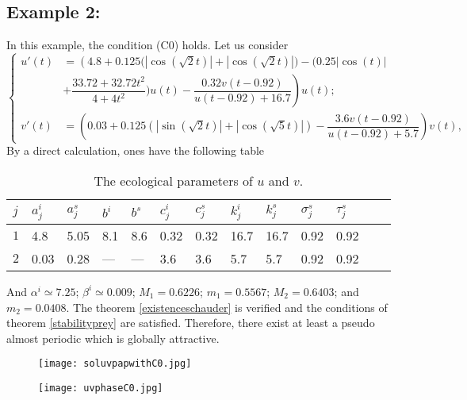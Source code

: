 \documentclass[[a4paper,10pt]{article}
\begin{document}
\subsection{Example 2:} \hspace{1cm}In this example, the condition (C0) holds. Let us consider
\begin{equation}
\left \{
\begin{aligned}
u'(t)&=\left(4.8+0.125\big(|\cos(\sqrt{2}t)|+|\cos(\sqrt{2}t)|\big)-\big(0.25|\cos(t)|\right.\\&+\left.\dfrac{33.72+32.72t^2}{4+4t^2}\big)u(t)-\dfrac{0.32 v(t-0.92)}{u(t-0.92)+16.7}\right)u(t);\\
v'(t)&=\left(0.03+0.125(|\sin(\sqrt 2t)|+|\cos(\sqrt 5t)|)-\dfrac{3.6v(t-0.92)}{u(t-0.92)+5.7}\right)v(t), 
\end{aligned}
\right. 
\end{equation}
By a direct calculation, ones have the following table
\begin{center}
\begin{table}[hptb]
\caption{The ecological parameters of $u$ and $v$.}
\begin{center}
\begin{tabular}{|p{0.5cm}|p{1cm}|p{1cm}| p{1cm}|p{1cm}|p{1cm}|p{1cm}|p{1cm}|p{1cm}|p{1cm}|p{1cm}|p{1cm}|l}
\hline
$j$ & $a_j^i$ & $a_j^s$ & $b^i$& $b^s$& $c_j^i$ & $c_j^s$ & $k_j^i$ & $k_j^s$ & $\sigma_j^s$ & $\tau_j^s$\\
  \hline\hline
$1$&4.8 & 5.05& 8.1 & 8.6 &0.32 &0.32 &16.7 &16.7 & 0.92& 0.92\\
\hline
$2$& 0.03& 0.28 &---&---&3.6 &3.6 & 5.7& 5.7& 0.92& 0.92 \\
\hline
\end{tabular}
\end{center}
\end{table}
\end{center}
And $\alpha^i\simeq 7.25$; $\beta^i\simeq 0.009$; $M_1=0.6226$; $m_1=0.5567$; $M_2=0.6403$; and $m_2=0.0408$.
The theorem \eqref{existenceschauder} is verified and the conditions of  theorem \eqref{stabilityprey} are satisfied. Therefore, there exist  at least a pseudo almost periodic which is globally attractive.
\begin{figure}[ht]
\centering
\texttt{[image: soluvpapwithC0.jpg]}
\end{figure}

\begin{figure}[ht]
\centering
\texttt{[image: uvphaseC0.jpg]}
\end{figure}
\end{document}
